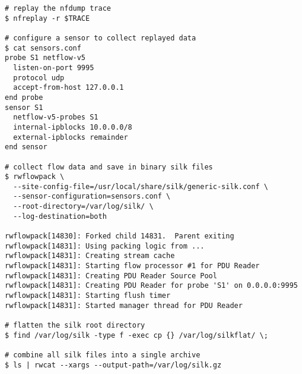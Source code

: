 \begin{lstlisting}
# replay the nfdump trace
$ nfreplay -r $TRACE

# configure a sensor to collect replayed data
$ cat sensors.conf
probe S1 netflow-v5
  listen-on-port 9995
  protocol udp
  accept-from-host 127.0.0.1
end probe
sensor S1
  netflow-v5-probes S1
  internal-ipblocks 10.0.0.0/8
  external-ipblocks remainder
end sensor

# collect flow data and save in binary silk files
$ rwflowpack \
  --site-config-file=/usr/local/share/silk/generic-silk.conf \
  --sensor-configuration=sensors.conf \
  --root-directory=/var/log/silk/ \
  --log-destination=both

rwflowpack[14830]: Forked child 14831.  Parent exiting
rwflowpack[14831]: Using packing logic from ...
rwflowpack[14831]: Creating stream cache
rwflowpack[14831]: Starting flow processor #1 for PDU Reader
rwflowpack[14831]: Creating PDU Reader Source Pool
rwflowpack[14831]: Creating PDU Reader for probe 'S1' on 0.0.0.0:9995
rwflowpack[14831]: Starting flush timer
rwflowpack[14831]: Started manager thread for PDU Reader

# flatten the silk root directory
$ find /var/log/silk -type f -exec cp {} /var/log/silkflat/ \;

# combine all silk files into a single archive
$ ls | rwcat --xargs --output-path=/var/log/silk.gz
\end{lstlisting}
